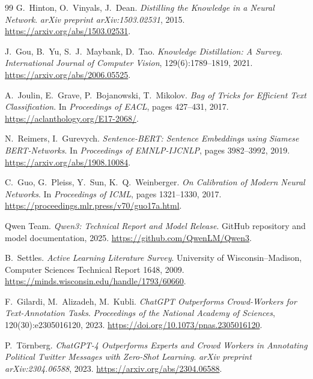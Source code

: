 \documentclass[11pt,a4paper]{article}
\begin{document}
\begin{thebibliography}{99}
G.~Hinton, O.~Vinyals, J.~Dean.
\newblock \emph{Distilling the Knowledge in a Neural Network}.
\newblock \emph{arXiv preprint arXiv:1503.02531}, 2015.
\newblock \url{https://arxiv.org/abs/1503.02531}.

J.~Gou, B.~Yu, S.~J.~Maybank, D.~Tao.
\newblock \emph{Knowledge Distillation: A Survey}.
\newblock \emph{International Journal of Computer Vision}, 129(6):1789--1819, 2021.
\newblock \url{https://arxiv.org/abs/2006.05525}.

A.~Joulin, E.~Grave, P.~Bojanowski, T.~Mikolov.
\newblock \emph{Bag of Tricks for Efficient Text Classification}.
\newblock In \emph{Proceedings of EACL}, pages 427--431, 2017.
\newblock \url{https://aclanthology.org/E17-2068/}.

N.~Reimers, I.~Gurevych.
\newblock \emph{Sentence-BERT: Sentence Embeddings using Siamese BERT-Networks}.
\newblock In \emph{Proceedings of EMNLP-IJCNLP}, pages 3982--3992, 2019.
\newblock \url{https://arxiv.org/abs/1908.10084}.

C.~Guo, G.~Pleiss, Y.~Sun, K.~Q.~Weinberger.
\newblock \emph{On Calibration of Modern Neural Networks}.
\newblock In \emph{Proceedings of ICML}, pages 1321--1330, 2017.
\newblock \url{https://proceedings.mlr.press/v70/guo17a.html}.

Qwen Team.
\newblock \emph{Qwen3: Technical Report and Model Release}.
\newblock GitHub repository and model documentation, 2025.
\newblock \url{https://github.com/QwenLM/Qwen3}.

B.~Settles.
\newblock \emph{Active Learning Literature Survey}.
\newblock University of Wisconsin--Madison, Computer Sciences Technical
Report 1648, 2009.
\newblock \url{https://minds.wisconsin.edu/handle/1793/60660}.

F.~Gilardi, M.~Alizadeh, M.~Kubli.
\newblock \emph{ChatGPT Outperforms Crowd-Workers for Text-Annotation Tasks}.
\newblock \emph{Proceedings of the National Academy of Sciences}, 120(30):e2305016120, 2023.
\newblock \url{https://doi.org/10.1073/pnas.2305016120}.

P.~T\"ornberg.
\newblock \emph{ChatGPT-4 Outperforms Experts and Crowd Workers in Annotating
Political Twitter Messages with Zero-Shot Learning}.
\newblock \emph{arXiv preprint arXiv:2304.06588}, 2023.
\newblock \url{https://arxiv.org/abs/2304.06588}.


\end{thebibliography}
\end{document}
